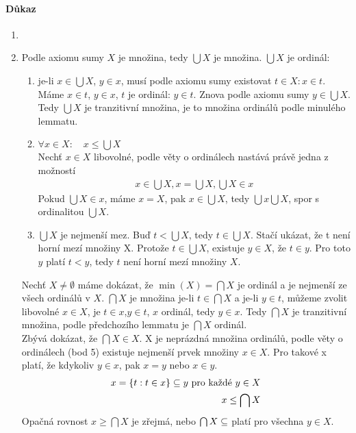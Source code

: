 \documentclass[a4paper,12pt,titlepage]{article}
\begin{document}
\paragraph{Důkaz}
\begin{enumerate}
	\item \ \\
	\item Podle axiomu sumy $X$ je množina, tedy $\bigcup X$ je množina.
	$\bigcup X$ je ordinál:
	\begin{enumerate}
		\item je-li $x \in \bigcup X$, $y \in x$, musí podle axiomu sumy
		existovat $t \in X: x \in t$. Máme $x \in t$, $y \in x$, $t$ je ordinál:
		$y \in t$. Znova podle axiomu sumy $y \in \bigcup X$. Tedy $\bigcup X$
		je tranzitivní množina, je to množina ordinálů podle minulého lemmatu.
		\item $\forall x \in X: \quad x \le \bigcup X$ \\
		Nechť $x \in X$ libovolné, podle věty o ordinálech nastává právě
		jedna z možností
		\begin{align}
			x \in \bigcup X, x = \bigcup X, \bigcup X \in x
		\end{align}
		Pokud
			$\bigcup X \in x$, máme $x = X$, pak $x \in \bigcup X$, 
				tedy $\bigcup x \bigcup X$, spor s ordinalitou $\bigcup X$.


		\item $\bigcup X$ je nejmenší mez. Buď $t < \bigcup X$, tedy $t \in
		\bigcup X$. Stačí ukázat, že t není horní mezí množiny X. Protože $t \in
		\bigcup X$, existuje $y \in X$, že $t \in y$. Pro toto $y$  platí $t <
		y$, tedy $t$
		není horní mezí množiny $X$.
	\end{enumerate}
	Nechť $X \neq \emptyset$ máme dokázat, že $\min(X) = \bigcap X$ je ordinál a
	je nejmenší ze všech ordinálů v $X$. $\bigcap X$ je množina je-li $t \in
	\bigcap X$ a je-li $y \in t$, můžeme zvolit libovolné $x \in X$, je $t \in x$,$y
	\in t$, $x$ ordinál, tedy $y \in x$. Tedy $\bigcap X$ je tranzitivní množina, podle
	předchozího lemmatu je $\bigcap X$ ordinál. \\
	Zbývá dokázat, že $\bigcap X \in X$. X je neprázdná množina ordinálů, podle
	věty o ordinálech (bod 5) existuje nejmenší prvek množiny $x \in X$. Pro
	takové x platí, že kdykoliv $y \in x$, pak $x = y$ nebo $x \in y$.
	\begin{align}
		x = \{t: t \in x \} \subseteq y \text{ pro každé } y \in X \\
		x \le \bigcap X
	\end{align}
	Opačná rovnost $x \ge \bigcap X$ je zřejmá, nebo $\bigcap X \subseteq$ platí
	pro všechna $y \in X$.
\end{enumerate}
\end{document}
